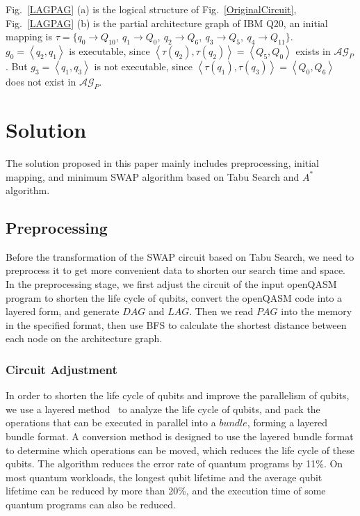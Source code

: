 \documentclass[runningheads]{llncs}
\begin{document}
\begin{example}
	Fig.~\ref{LAGPAG} (a) is the logical structure of Fig.~\ref{OriginalCircuit}, 
	Fig.~\ref{LAGPAG} (b) is the partial architecture graph of IBM Q20, an initial mapping is 
	$\tau=\{q_{0}\rightarrow  Q_{10},\ q_{1}\rightarrow Q_{0},\ 
			q_{2}\rightarrow  Q_{6},\ q_{3}\rightarrow  Q_{5},\ q_{4}\rightarrow  Q_{11}\}$.
			$g_{0}=\left \langle q_{2},q_{1}\right \rangle $ is executable, since 
			$\left \langle \tau(q_{2}),\tau(q_{2})\right \rangle =\left \langle Q_{5},Q_{0}\right \rangle $ exists in $\mathcal{AG}_{P}$.
	But $g_{3}=\left \langle q_{1},q_{3}\right \rangle $ is not executable, since 
	$\left \langle \tau(q_{1}),\tau(q_{3})\right \rangle =\left \langle Q_{0},Q_{6}\right \rangle $  does not exist in $\mathcal{AG}_{P}$.
\end{example}
\section{Solution}
\label{Solution}
The solution proposed in this paper mainly includes preprocessing, 
initial mapping, 
and minimum SWAP algorithm based on Tabu Search and  $A^{*}$ algorithm.
\subsection{Preprocessing}
Before the transformation of the SWAP circuit based on Tabu Search, 
we need to preprocess it to get more convenient data to shorten our search time and space.
In the preprocessing stage, we first adjust the circuit of the input openQASM 
program to shorten the life cycle of qubits, convert the openQASM code 
into a layered form, and generate $DAG$ and $LAG$.
Then we read $PAG$ into the memory in the specified format, then use BFS to calculate 
the shortest distance between each node on the architecture graph.
\subsubsection{Circuit Adjustment}
In order to shorten the life cycle of qubits and improve the parallelism of qubits, 
we use a layered method~\cite{2019Zhang} to analyze the life cycle of qubits, 
and pack the operations that can be executed in parallel into a $bundle$, forming a layered bundle format.
A conversion method is designed to use the layered bundle format to determine 
which operations can be moved, which reduces the life cycle of these qubits.
The algorithm reduces the error rate of quantum programs by 11\%. 
On most quantum workloads, the longest qubit lifetime and the average qubit lifetime 
can be reduced by more than 20\%, and the execution time of some quantum programs can also be reduced.
\end{document}
